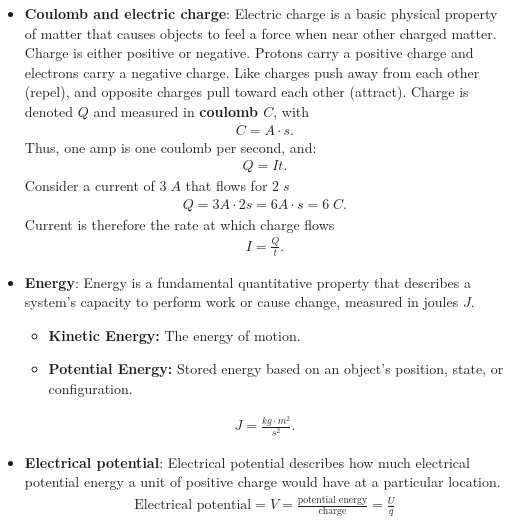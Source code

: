 \documentclass{report}
\begin{document}
\begin{itemize}
        \item \textbf{Coulomb and electric charge}: Electric charge is a basic physical property of matter that causes objects to feel a force when near other charged matter. 
            Charge is either positive or negative. Protons carry a positive charge and electrons carry a negative charge.
            \bigbreak \noindent 
            Like charges push away from each other (repel), and opposite charges pull toward each other (attract).
            \bigbreak \noindent 
            Charge is denoted $Q$ and measured in \textbf{coulomb $C$}, with
            \begin{align*}
                C = A \cdot s
            .\end{align*}
            Thus, one amp is one coulomb per second, and:
            \begin{align*}
                Q = It
            .\end{align*}
            Consider a current of $3\; A$ that flows for $2\; s$
            \begin{align*}
                Q = 3A \cdot 2s = 6 A \cdot s = 6\; C
            .\end{align*}
            Current is therefore the rate at which charge flows
            \begin{align*}
                I = \frac{Q}{t}
            .\end{align*}
        \item \textbf{Energy}: Energy is a fundamental quantitative property that describes a system's capacity to perform work or cause change, measured in joules $J$.
            \begin{itemize}
                \item \textbf{Kinetic Energy:} The energy of motion.
                \item \textbf{Potential Energy:} Stored energy based on an object's position, state, or configuration.
            \end{itemize}
            \begin{align*}
                J = \frac{kg \cdot m^{2}}{s^{2}}
            .\end{align*}
        \item \textbf{Electrical potential}: Electrical potential describes how much electrical potential energy a unit of positive charge would have at a particular location.
            \begin{align*}
                \text{Electrical potential} = V = \frac{\text{potential energy}}{\text{charge}} = \frac{U}{q}

\end{align*}
\end{itemize}
\end{document}
